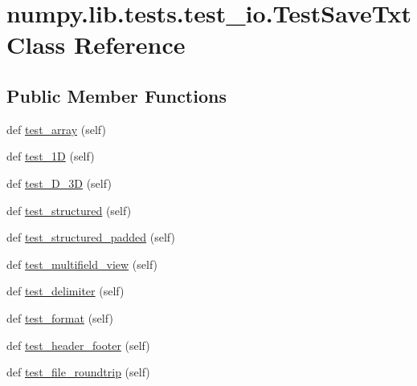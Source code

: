 \hypertarget{classnumpy_1_1lib_1_1tests_1_1test__io_1_1TestSaveTxt}{}\section{numpy.\+lib.\+tests.\+test\+\_\+io.\+Test\+Save\+Txt Class Reference}
\label{classnumpy_1_1lib_1_1tests_1_1test__io_1_1TestSaveTxt}
\subsection*{Public Member Functions}
\begin{DoxyCompactItemize}
\item 
def \hyperlink{classnumpy_1_1lib_1_1tests_1_1test__io_1_1TestSaveTxt_a13986c694b6ad46803673c7bec5686fb}{test\+\_\+array} (self)
\item 
def \hyperlink{classnumpy_1_1lib_1_1tests_1_1test__io_1_1TestSaveTxt_aaa7280870d20f8c16ff884f72f0db16a}{test\+\_\+1D} (self)
\item 
def \hyperlink{classnumpy_1_1lib_1_1tests_1_1test__io_1_1TestSaveTxt_ab5ea9b8f1e2cabca7301d39f81dd97db}{test\+\_\+D\+\_\+3D} (self)
\item 
def \hyperlink{classnumpy_1_1lib_1_1tests_1_1test__io_1_1TestSaveTxt_a8b997a41c70f5e12c11afc69bf9bdf40}{test\+\_\+structured} (self)
\item 
def \hyperlink{classnumpy_1_1lib_1_1tests_1_1test__io_1_1TestSaveTxt_a85d2dca3b0308face318a454dc21fd36}{test\+\_\+structured\+\_\+padded} (self)
\item 
def \hyperlink{classnumpy_1_1lib_1_1tests_1_1test__io_1_1TestSaveTxt_a5451c1ddf9d87607f9c6e497c8cca335}{test\+\_\+multifield\+\_\+view} (self)
\item 
def \hyperlink{classnumpy_1_1lib_1_1tests_1_1test__io_1_1TestSaveTxt_af0ef3ad78d16fb12b9a105fc0d252574}{test\+\_\+delimiter} (self)
\item 
def \hyperlink{classnumpy_1_1lib_1_1tests_1_1test__io_1_1TestSaveTxt_a303491f5c8a7e5b8abebe969d38437ac}{test\+\_\+format} (self)
\item 
def \hyperlink{classnumpy_1_1lib_1_1tests_1_1test__io_1_1TestSaveTxt_ab1eb3bb474d69340a7b0361bbb1f898c}{test\+\_\+header\+\_\+footer} (self)
\item 
def \hyperlink{classnumpy_1_1lib_1_1tests_1_1test__io_1_1TestSaveTxt_a158f250f96c7907c575e6db8a47232ba}{test\+\_\+file\+\_\+roundtrip} (self)
\item 

\end{DoxyCompactItemize}
